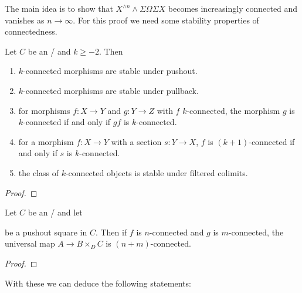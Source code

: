 The main idea is to show that $X^{\wedge n}\wedge\Sigma\Omega\Sigma X$ becomes increasingly connected and vanishes as $n\to\infty$.
For this proof we need some stability properties of connectedness.
\begin{prop}\label{prop:conn}
    Let $C$ be an \inftytop/ and $k\geq -2$.
    Then
    \begin{enumerate}[label={(\roman*)}]
        \item $k$-connected morphisms are stable under pushout. \label{prop:connStableUnderPo}
        \item $k$-connected morphisms are stable under pullback.\label{prop:connStableUnderPb}
        \item for morphisms $f\colon X\to Y$ and $g\colon Y\to Z$ with $f$ $k$-connected, the morphism $g$ is $k$-connected if and only if $gf$ is $k$-connected. \label{prop:connRightCancel}
        \item for a morphism $f\colon X\to Y$ with a section $s\colon Y\to X$, $f$ is $(k+1)$-connected if and only if $s$ is $k$-connected. \label{prop:connSection}
        \item the class of $k$-connected objects is stable under filtered colimits. \label{prop:connStableFilteredColim}
    \end{enumerate}
    \begin{proof}
    \end{proof}
\end{prop}
\begin{prop}\label{prop:blakersMassay}
    Let $C$ be an \inftytop/ and let 
    \begin{center}
    \end{center}
    be a pushout square in $C$.
    Then if $f$ is $n$-connected and $g$ is $m$-connected, the universal map $A\to B\times_{D}C$ is $(n+m)$-connected.
    \begin{proof}
    \end{proof}
\end{prop}
With these we can deduce the following statements:
